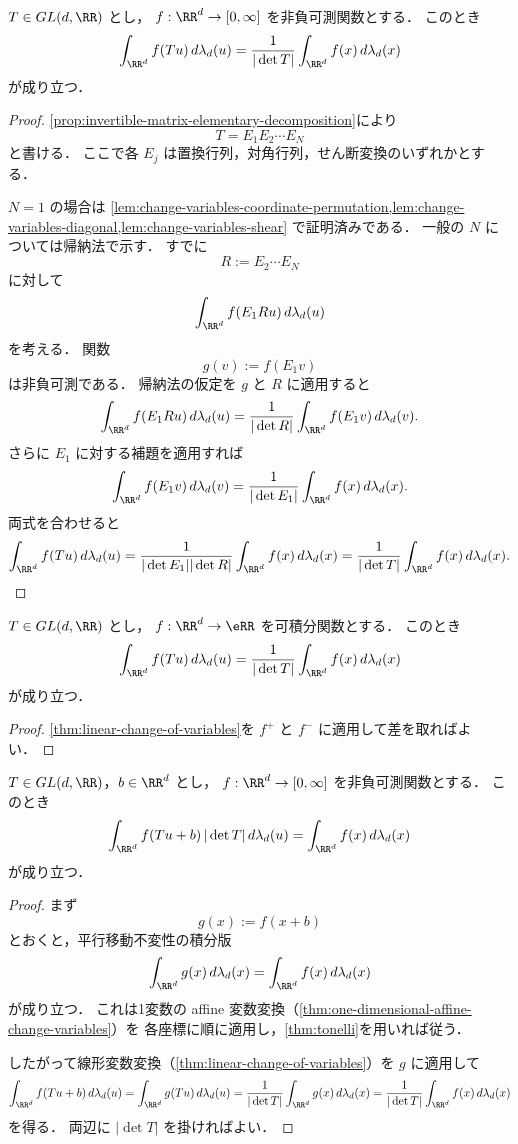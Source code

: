 \begin{theorem}[線形変数変換]\label{thm:linear-change-of-variables}
$T\in GL(d,\RR)$ とし，
$f:\RR^d\to[0,\infty]$ を非負可測関数とする．
このとき
\[
\int_{\RR^d}f(Tu)\,d\lambda_d(u)
=
\frac{1}{|\det T|}\int_{\RR^d}f(x)\,d\lambda_d(x)
\]
が成り立つ．
\end{theorem}
\begin{proof}
\cref{prop:invertible-matrix-elementary-decomposition}により
\[
T=E_1E_2\cdots E_N
\]
と書ける．
ここで各 $E_j$ は置換行列，対角行列，せん断変換のいずれかとする．

$N=1$ の場合は
\cref{lem:change-variables-coordinate-permutation,lem:change-variables-diagonal,lem:change-variables-shear}
で証明済みである．
一般の $N$ については帰納法で示す．
すでに
\[
R:=E_2\cdots E_N
\]
に対して
\[
\int_{\RR^d}f(E_1Ru)\,d\lambda_d(u)
\]
を考える．
関数
\[
g(v):=f(E_1v)
\]
は非負可測である．
帰納法の仮定を $g$ と $R$ に適用すると
\[
\int_{\RR^d}f(E_1Ru)\,d\lambda_d(u)
=
\frac{1}{|\det R|}\int_{\RR^d}f(E_1v)\,d\lambda_d(v).
\]
さらに $E_1$ に対する補題を適用すれば
\[
\int_{\RR^d}f(E_1v)\,d\lambda_d(v)
=
\frac{1}{|\det E_1|}\int_{\RR^d}f(x)\,d\lambda_d(x).
\]
両式を合わせると
\[
\int_{\RR^d}f(Tu)\,d\lambda_d(u)
=
\frac{1}{|\det E_1||\det R|}\int_{\RR^d}f(x)\,d\lambda_d(x)
=
\frac{1}{|\det T|}\int_{\RR^d}f(x)\,d\lambda_d(x).
\]
\end{proof}

\begin{corollary}[可積分関数に対する線形変数変換]\label{cor:linear-change-of-variables-integrable}
$T\in GL(d,\RR)$ とし，
$f:\RR^d\to\eRR$ を可積分関数とする．
このとき
\[
\int_{\RR^d}f(Tu)\,d\lambda_d(u)
=
\frac{1}{|\det T|}\int_{\RR^d}f(x)\,d\lambda_d(x)
\]
が成り立つ．
\end{corollary}
\begin{proof}
\cref{thm:linear-change-of-variables}を $f^+$ と $f^-$ に適用して差を取ればよい．
\end{proof}

\begin{corollary}\label{cor:affine-change-of-variables}
$T\in GL(d,\RR)$，$b\in\RR^d$ とし，
$f:\RR^d\to[0,\infty]$ を非負可測関数とする．
このとき
\[
\int_{\RR^d}f(Tu+b)\,|\det T|\,d\lambda_d(u)
=
\int_{\RR^d}f(x)\,d\lambda_d(x)
\]
が成り立つ．
\end{corollary}
\begin{proof}
まず
\[
g(x):=f(x+b)
\]
とおくと，平行移動不変性の積分版
\[
\int_{\RR^d}g(x)\,d\lambda_d(x)=\int_{\RR^d}f(x)\,d\lambda_d(x)
\]
が成り立つ．
これは1変数の affine 変数変換（\cref{thm:one-dimensional-affine-change-variables}）を
各座標に順に適用し，\cref{thm:tonelli}を用いれば従う．

したがって線形変数変換（\cref{thm:linear-change-of-variables}）を $g$ に適用して
\[
\int_{\RR^d}f(Tu+b)\,d\lambda_d(u)
=
\int_{\RR^d}g(Tu)\,d\lambda_d(u)
=
\frac1{|\det T|}\int_{\RR^d}g(x)\,d\lambda_d(x)
=
\frac1{|\det T|}\int_{\RR^d}f(x)\,d\lambda_d(x)
\]
を得る．
両辺に $|\det T|$ を掛ければよい．
\end{proof}

